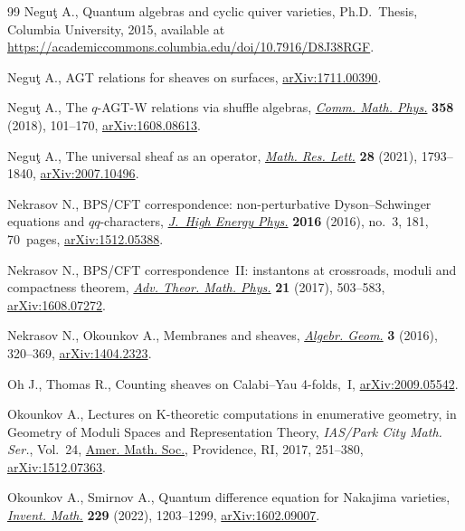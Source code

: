\begin{thebibliography}{99}
Negu\c{t} A., Quantum algebras and cyclic quiver varieties, Ph.D.~Thesis,
 {C}olumbia University, 2015, available at
 \url{https://academiccommons.columbia.edu/doi/10.7916/D8J38RGF}.

Negu\c{t} A., {AGT} relations for sheaves on surfaces, \href{https://arxiv.org/abs/1711.00390}{arXiv:1711.00390}.

Negu\c{t} A., The $q$-{AGT}-{W} relations via shuffle algebras, \href{https://doi.org/10.1007/s00220-018-3102-3}{\textit{Comm.
 Math. Phys.}} \textbf{358} (2018), 101--170, \href{https://arxiv.org/abs/1608.08613}{arXiv:1608.08613}.

Negu\c{t} A., The universal sheaf as an operator, \href{https://doi.org/10.48550/arXiv.2007.10496}{\textit{Math. Res. Lett.}}
 \textbf{28} (2021), 1793--1840, \href{https://arxiv.org/abs/2007.10496}{arXiv:2007.10496}.

Nekrasov N., BPS/CFT correspondence: non-perturbative {D}yson--{S}chwinger
 equations and $qq$-characters, \href{https://doi.org/10.1007/JHEP03(2016)181}{\textit{J.~High Energy Phys.}} \textbf{2016}
 (2016), no.~3, 181, 70~pages, \href{https://arxiv.org/abs/1512.05388}{arXiv:1512.05388}.

Nekrasov N., B{PS}/{CFT} correspondence~{II}: instantons at crossroads, moduli
 and compactness theorem, \href{https://doi.org/10.4310/ATMP.2017.v21.n2.a4}{\textit{Adv. Theor. Math. Phys.}} \textbf{21} (2017),
 503--583, \href{https://arxiv.org/abs/1608.07272}{arXiv:1608.07272}.

Nekrasov N., Okounkov A., Membranes and sheaves, \href{https://doi.org/10.14231/AG-2016-015}{\textit{Algebr. Geom.}}
 \textbf{3} (2016), 320--369, \href{https://arxiv.org/abs/1404.2323}{arXiv:1404.2323}.

Oh J., Thomas R., Counting sheaves on {C}alabi--{Y}au 4-folds,~I,
 \href{https://arxiv.org/abs/2009.05542}{arXiv:2009.05542}.

Okounkov A., Lectures on {K}-theoretic computations in enumerative geometry, in
 Geometry of Moduli Spaces and Representation Theory, \textit{IAS/Park City
 Math. Ser.}, Vol.~24, \href{https://doi.org/10.1090/pcms/024}{Amer. Math. Soc.}, Providence, RI, 2017, 251--380,
 \href{https://arxiv.org/abs/1512.07363}{arXiv:1512.07363}.

Okounkov A., Smirnov A., Quantum difference equation for {N}akajima varieties,
\href{https://doi.org/10.1007/s00222-022-01125-w}{\textit{Invent. Math.}} \textbf{229} (2022), 1203--1299,
 \href{https://arxiv.org/abs/1602.09007}{arXiv:1602.09007}.


\end{thebibliography}
